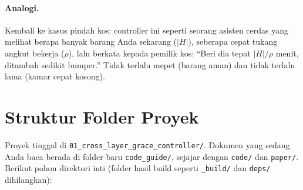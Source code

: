\documentclass[11pt]{article}
\newcommand{\code}[1]{\texttt{\small #1}}
\begin{document}
\paragraph{Analogi.} Kembali ke kasus pindah kos: controller ini seperti seorang asisten cerdas yang
melihat berapa banyak barang Anda sekarang ($|H|$), seberapa cepat tukang angkut bekerja ($\rho$),
lalu berkata kepada pemilik kos: ``Beri dia tepat $|H|/\rho$ menit, ditambah sedikit bumper.'' Tidak
terlalu mepet (barang aman) dan tidak terlalu lama (kamar cepat kosong).

\section{Struktur Folder Proyek}
\label{sec:struktur}

Proyek tinggal di \code{01\_cross\_layer\_grace\_controller/}. Dokumen yang sedang Anda baca berada di
folder baru \code{code\_guide/}, sejajar dengan \code{code/} dan \code{paper/}. Berikut pohon
direktori inti (folder hasil build seperti \code{\_build/} dan \code{deps/} dihilangkan):
\end{document}
